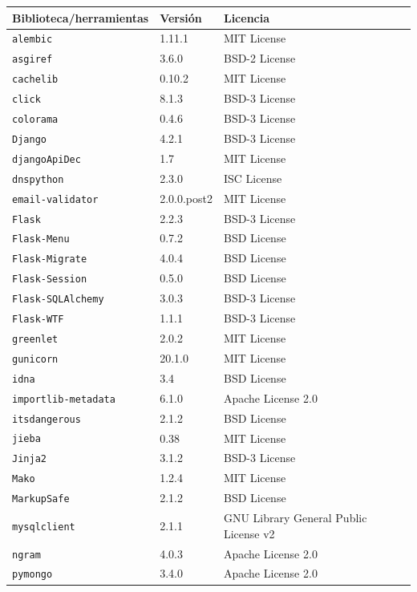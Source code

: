 \begin{table}
\centering 
\begin{tabular}{|l|p{}|p{}|}
\hline
\textbf{Biblioteca/herramientas} & \textbf{Versión} & \textbf{Licencia} \\
\hline
\texttt{alembic} & 1.11.1 & MIT License \\
\texttt{asgiref} & 3.6.0 & BSD-2 License \\
\texttt{cachelib} & 0.10.2 & MIT License \\
\texttt{click} & 8.1.3 & BSD-3 License \\
\texttt{colorama} & 0.4.6 & BSD-3 License \\
\texttt{Django} & 4.2.1 & BSD-3 License \\
\texttt{djangoApiDec} & 1.7 & MIT License \\
\texttt{dnspython} & 2.3.0 & ISC License \\
\texttt{email-validator} & 2.0.0.post2 & MIT License \\
\texttt{Flask} & 2.2.3 & BSD-3 License \\
\texttt{Flask-Menu} & 0.7.2 & BSD License \\
\texttt{Flask-Migrate} & 4.0.4 & BSD License \\
\texttt{Flask-Session} & 0.5.0 & BSD License \\
\texttt{Flask-SQLAlchemy} & 3.0.3 & BSD-3 License \\
\texttt{Flask-WTF} & 1.1.1 & BSD-3 License \\
\texttt{greenlet} & 2.0.2 & MIT License \\
\texttt{gunicorn} & 20.1.0 & MIT License \\
\texttt{idna} & 3.4 & BSD License \\
\texttt{importlib-metadata} & 6.1.0 & Apache License 2.0 \\
\texttt{itsdangerous} & 2.1.2 & BSD License \\
\texttt{jieba} & 0.38 & MIT License \\
\texttt{Jinja2} & 3.1.2 & BSD-3 License \\
\texttt{Mako} & 1.2.4 & MIT License \\
\texttt{MarkupSafe} & 2.1.2 & BSD License \\
\texttt{mysqlclient} & 2.1.1 & GNU Library General Public License v2 \\
\texttt{ngram} & 4.0.3 & Apache License 2.0 \\
\texttt{pymongo} & 3.4.0 & Apache License 2.0 \\

\end{tabular}
\end{table}
